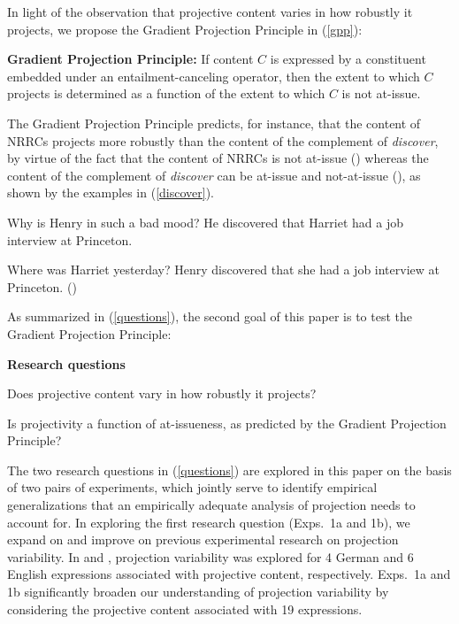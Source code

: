 \documentclass[11pt,fleqn]{article}
\newcommand{\6}{\mbox{$[\hspace*{-.6mm}[$}}
\newcommand{\9}{\mbox{$]\hspace*{-.6mm}]$}}
\begin{document}
In light of the observation that projective content varies in how robustly it projects, we propose the Gradient Projection Principle in (\ref{gpp}):

\begin{exe}
\ex\label{gpp} {\bf Gradient Projection Principle:} If content $C$ is expressed by a constituent embedded under an entailment-canceling operator, then the extent to which $C$ projects is determined as a function of the extent to which $C$ is not at-issue.

\end{exe} 
The Gradient Projection Principle predicts, for instance, that the content of NRRCs projects more robustly than the content of the complement of {\em discover}, by virtue of the fact that the content of NRRCs is not at-issue (\citealt{potts05}) whereas the content of the complement of {\em discover} can be at-issue and not-at-issue (\citealt{simons07}), as shown by the examples in (\ref{discover}).

\begin{exe}
\ex\label{discover}
\begin{xlist}

\ex
\begin{xlist}
 Why is Henry in such a bad mood?
 He discovered that Harriet had a job interview at Princeton. 
\end{xlist}

\ex
\begin{xlist}
 Where was Harriet yesterday?
 Henry discovered that she had a job interview at Princeton. \hfill (\citealt[1035]{simons07})
\end{xlist}
\end{xlist}
\end{exe}
As summarized in (\ref{questions}), the second goal of this paper is to test the Gradient Projection Principle:

\begin{exe}
\ex\label{questions} {\bf Research questions}

\begin{xlist} 

\ex Does projective content vary in how robustly it projects?

\ex Is projectivity a function of at-issueness, as predicted by the Gradient Projection Principle?
\end{xlist}

\end{exe} 

The two research questions in (\ref{questions}) are explored in this paper on the basis of two pairs of experiments, which jointly serve to identify empirical generalizations that an empirically adequate analysis of projection needs to account for. In exploring the first research question (Exps.~1a and 1b), we expand on and improve on previous experimental research on projection variability. In \citealt{xue-onea11} and \citealt{smith-hall11}, projection variability was explored for 4 German and 6 English expressions associated with projective content, respectively. Exps.~1a and 1b significantly broaden our understanding of projection variability by considering the projective content associated with 19 expressions. 
\end{document}
